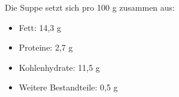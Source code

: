 \documentclass[a4paper,11pt]{article}
\newif\ifshowme
\begin{document}
Die Suppe setzt sich pro 100 g zusammen aus: \par 
\begin{itemize}
\item Fett: 14,3 g
\item Proteine: 2,7 g
\item Kohlenhydrate: 11,5 g
\item Weitere Bestandteile: 0,5 g
\end{itemize}




\ifshowme
\antwort{
Zunächst Wärmekapazität $c$ ausrechnen:
\begin{align*}
c &= ~~~ 4,180 \cdot 0,71 + 1,711 \cdot 0,027 + 1,928 \cdot 0,143 \\
&~~~ + 1,547 \cdot 0,115 + 0,908 \cdot 0,005 \\
 &= ~~~ 3,472146~ \text{kJ} \cdot \text{kg}^{-1} \cdot \text{K}^{-1}
\end{align*}
Energie berechnen:
\begin{align*}
Q &= m \cdot c \cdot \Delta T \\ \\
Q &= 6,5~ \text{kg} \cdot 3,472~ \text{kJ} \cdot \text{kg}^{-1}\cdot \text{K}^{-1} \cdot (333,15-283,15 ~ \text{K}) \\
&= 1.128,45~ \text{kJ} \\
&= 1.128,45~ \text{kWs}  \\
&= 0,313~ \text{kWh}
\end{align*}

}
\pagebreak
\else
\fi
\end{document}
